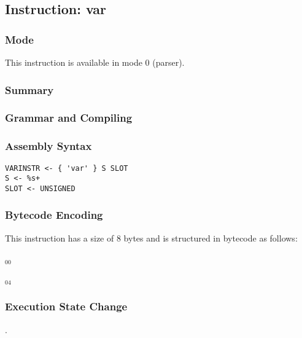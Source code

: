 \subsection{Instruction: var}

\subsubsection{Mode}
This instruction is available in mode 0 (parser).
\subsubsection{Summary}


\subsubsection{Grammar and Compiling}


\subsubsection{Assembly Syntax}

\begin{myquote}
\begin{verbatim}
VARINSTR <- { 'var' } S SLOT
S <- %s+
SLOT <- UNSIGNED
\end{verbatim}
\end{myquote}

\subsubsection{Bytecode Encoding}

This instruction has a size of 8 bytes and is structured in bytecode as follows:

$_{00}$\ 



$_{04}$\ 


\subsubsection{Execution State Change}

.


